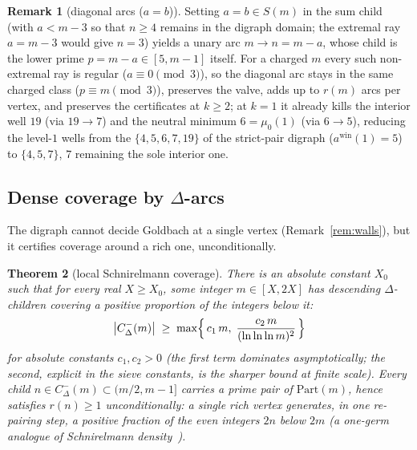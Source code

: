 \documentclass[11pt]{article}
\theoremstyle{plain}
\newtheorem{theorem}{Theorem}[section]
\theoremstyle{definition}
\newtheorem{remark}[theorem]{Remark}
\newcommand{\rays}{S}
\newcommand{\rch}{r}
\begin{document}
\begin{remark}[diagonal arcs ($a = b$)]\label{rem:diag}
Setting $a = b \in \rays(m)$ in the sum child (with $a < m - 3$ so
that $n \ge 4$ remains in the digraph domain; the extremal ray
$a = m - 3$ would give $n = 3$) yields a unary arc $m \to n = m - a$,
whose child is the lower prime $p = m - a \in [5, m - 1]$ itself.
For a charged $m$ every such non-extremal ray is regular
($a \equiv 0 \pmod 3$), so the diagonal arc stays in the same
charged class ($p \equiv m \pmod 3$), preserves the valve, adds up
to $\rch(m)$ arcs per vertex, and preserves the certificates at
$k \ge 2$; at $k = 1$ it already kills the interior well $19$ (via
$19 \to 7$) and the neutral minimum $6 = \mu_0(1)$ (via $6 \to 5$),
reducing the level-$1$ wells from the $\{4, 5, 6, 7, 19\}$ of the
strict-pair digraph ($a^{\mathrm{win}}(1) = 5$) to $\{4, 5, 7\}$, $7$
remaining the sole interior one.
\end{remark}

\subsection{Dense coverage by \texorpdfstring{$\Delta$}{Delta}-arcs}
\label{sec:dense}

The digraph cannot decide Goldbach at a single vertex
(Remark~\ref{rem:walls}), but it certifies coverage around a
rich one, unconditionally.

\begin{theorem}[local Schnirelmann coverage]\label{thm:dense}
There is an absolute constant $X_0$ such that for every real
$X \ge X_0$, some integer $m \in [X, 2X]$ has descending
$\Delta$-children covering a positive proportion of the integers
below it:
\[
\bigl|C_\Delta^{-}(m)\bigr|
\;\ge\; \max\Bigl\{\, c_1\, m,\;
\frac{c_2\, m}{(\ln\ln\ln m)^{2}} \,\Bigr\}
\]
for absolute constants $c_1, c_2 > 0$ (the first term dominates
asymptotically; the second, explicit in the sieve constants, is
the sharper bound at finite scale). Every child
$n \in C_\Delta^{-}(m) \subset (m/2, m-1]$ carries a prime pair of
$\mathrm{Part}(m)$, hence satisfies $\rch(n) \ge 1$
unconditionally: a single rich vertex generates, in one re-pairing
step, a positive fraction of the even integers $2n$ below $2m$ (a
one-germ analogue of Schnirelmann density~\cite{schnirelmann}).
\end{theorem}
\end{document}

